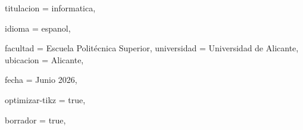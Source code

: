 {  %
  titulacion = informatica,
  
  idioma = espanol,
  
  
  facultad = {Escuela Politécnica Superior},
  universidad = {Universidad de Alicante},
  ubicacion = {Alicante},
  
  
  fecha = {Junio 2026},
  
  optimizar-tikz = true,
  
  borrador = true,
}

